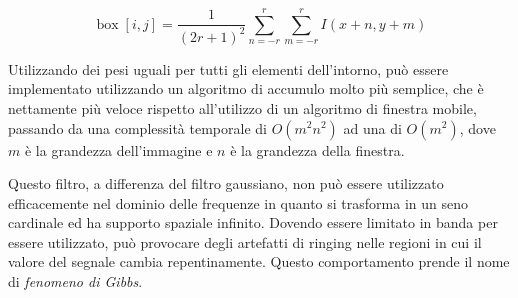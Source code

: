 \documentclass[../main.tex]{subfiles}
\begin{document}
\begin{equation}
	\operatorname{box}[i,j] = \frac{1}{(2r+1)^2}\sum_{n=-r}^{r}\sum_{m=-r}^{r} I(x+n, y+m)
\end{equation}

Utilizzando dei pesi uguali per tutti gli elementi dell'intorno, può essere implementato utilizzando un algoritmo di accumulo molto più semplice, che è nettamente più veloce rispetto all'utilizzo di un algoritmo di finestra mobile, passando da una complessità temporale di $O(m^2n^2)$ ad una di $O(m^2)$, dove $m$ è la grandezza dell'immagine e $n$ è la grandezza della finestra.\cite{jarosz_2001}

Questo filtro, a differenza del filtro gaussiano, non può essere utilizzato efficacemente nel dominio delle frequenze in quanto si trasforma in un seno cardinale ed ha supporto spaziale infinito. Dovendo essere limitato in banda per essere utilizzato, può provocare degli artefatti di ringing nelle regioni in cui il valore del segnale cambia repentinamente. Questo comportamento prende il nome di \textit{fenomeno di Gibbs}.\cite{carslaw_1925}
\end{document}
